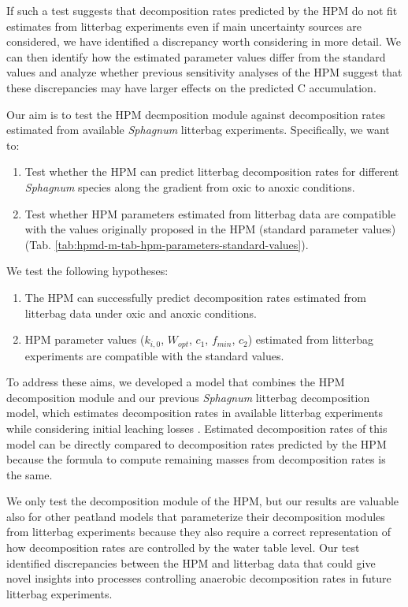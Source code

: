 \documentclass[esd, manuscript]{copernicus}
\begin{document}
If such a test suggests that decomposition rates predicted by the HPM do not fit estimates from litterbag experiments even if main uncertainty sources are considered, we have identified a discrepancy worth considering in more detail. We can then identify how the estimated parameter values differ from the standard values and analyze whether previous sensitivity analyses of the HPM suggest that these discrepancies may have larger effects on the predicted C accumulation.

Our aim is to test the HPM decmposition module against decomposition rates estimated from available \emph{Sphagnum} litterbag experiments. Specifically, we want to:

\begin{enumerate}
\def\labelenumi{\arabic{enumi}.}
\item
  Test whether the HPM can predict litterbag decomposition rates for different \emph{Sphagnum} species along the gradient from oxic to anoxic conditions.
\item
  Test whether HPM parameters estimated from litterbag data are compatible with the values originally proposed in the HPM (standard parameter values) (Tab. \ref{tab:hpmd-m-tab-hpm-parameters-standard-values}).
\end{enumerate}

We test the following hypotheses:

\begin{enumerate}
\def\labelenumi{\arabic{enumi}.}
\item
  The HPM can successfully predict decomposition rates estimated from litterbag data under oxic and anoxic conditions.
\item
  HPM parameter values (\(k_{i,0}\), \(W_{opt}\), \(c_1\), \(f_{min}\), \(c_2\)) estimated from litterbag experiments are compatible with the standard values.
\end{enumerate}

To address these aims, we developed a model that combines the HPM decomposition module and our previous \emph{Sphagnum} litterbag decomposition model, which estimates decomposition rates in available litterbag experiments while considering initial leaching losses \citep{Teickner.2024f}. Estimated decomposition rates of this model can be directly compared to decomposition rates predicted by the HPM because the formula to compute remaining masses from decomposition rates is the same.

We only test the decomposition module of the HPM, but our results are valuable also for other peatland models that parameterize their decomposition modules from litterbag experiments because they also require a correct representation of how decomposition rates are controlled by the water table level. Our test identified discrepancies between the HPM and litterbag data that could give novel insights into processes controlling anaerobic decomposition rates in future litterbag experiments.\\
\end{document}
